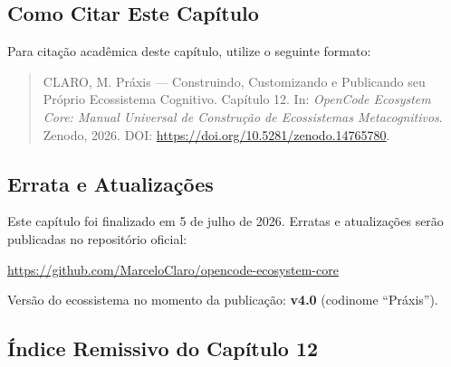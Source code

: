 \subsection{Como Citar Este Capítulo}

Para citação acadêmica deste capítulo, utilize o seguinte formato:

\begin{quote}
CLARO, M. Práxis — Construindo, Customizando e Publicando seu Próprio Ecossistema Cognitivo. Capítulo 12. In: \textit{OpenCode Ecosystem Core: Manual Universal de Construção de Ecossistemas Metacognitivos}. Zenodo, 2026. DOI: \url{https://doi.org/10.5281/zenodo.14765780}.
\end{quote}

\subsection{Errata e Atualizações}

Este capítulo foi finalizado em 5 de julho de 2026. Erratas e atualizações serão publicadas no repositório oficial:

\begin{center}
\url{https://github.com/MarceloClaro/opencode-ecosystem-core}
\end{center}

Versão do ecossistema no momento da publicação: \textbf{v4.0} (codinome ``Práxis'').

\subsection{Índice Remissivo do Capítulo 12}
\label{sec:indice-remissivo}


